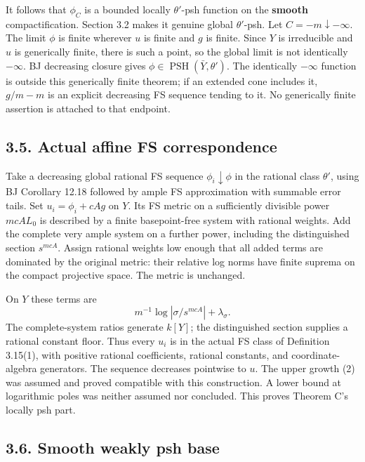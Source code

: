 \documentclass[
  11pt,
]{article}
\begin{document}
It follows that \(\phi_C\) is a bounded locally \(\theta'\)-psh function
on the \textbf{smooth} compactification. Section 3.2 makes it genuine
global \(\theta'\)-psh. Let \(C=-m\downarrow-\infty\). The limit
\(\phi\) is finite wherever \(u\) is finite and \(g\) is finite. Since
\(Y\) is irreducible and \(u\) is generically finite, there is such a
point, so the global limit is not identically \(-\infty\). BJ decreasing
closure gives \(\phi\in\operatorname{PSH}(\bar Y,\theta')\). The
identically \(-\infty\) function is outside this generically finite
theorem; if an extended cone includes it, \(g/m-m\) is an explicit
decreasing FS sequence tending to it. No generically finite assertion is
attached to that endpoint.

\subsection{3.5. Actual affine FS
correspondence}\label{actual-affine-fs-correspondence}

Take a decreasing global rational FS sequence \(\phi_i\downarrow\phi\)
in the rational class \(\theta'\), using BJ Corollary 12.18 followed by
ample FS approximation with summable error tails. Set \(u_i=\phi_i+cAg\)
on \(Y\). Its FS metric on a sufficiently divisible power \(m cA L_0\)
is described by a finite basepoint-free system with rational weights.
Add the complete very ample system on a further power, including the
distinguished section \(s^{mcA}\). Assign rational weights low enough
that all added terms are dominated by the original metric: their
relative log norms have finite suprema on the compact projective space.
The metric is unchanged.

On \(Y\) these terms are \[m^{-1}\log|\sigma/s^{mcA}|+\lambda_\sigma.\]
The complete-system ratios generate \(k[Y]\); the distinguished section
supplies a rational constant floor. Thus every \(u_i\) is in the actual
FS class of Definition 3.15(1), with positive rational coefficients,
rational constants, and coordinate-algebra generators. The sequence
decreases pointwise to \(u\). The upper growth (2) was assumed and
proved compatible with this construction. A lower bound at logarithmic
poles was neither assumed nor concluded. This proves Theorem C's locally
psh part.

\subsection{3.6. Smooth weakly psh base}\label{smooth-weakly-psh-base}
\end{document}
